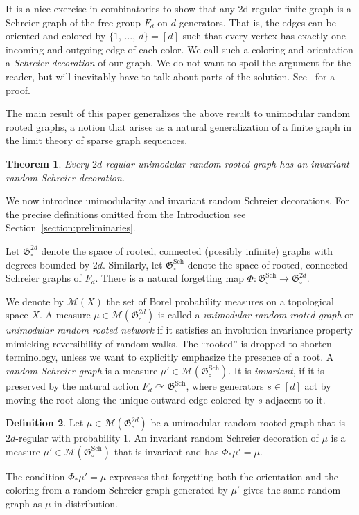 \documentclass[11pt]{article}
\newtheorem{theo}{Theorem}[section]
\theoremstyle{definition}
\newtheorem{defi}[theo]{Definition}
\numberwithin{equation}{section}
\numberwithin{figure}{section}
\numberwithin{table}{section}
\newcommand{\clM}{\mathcal{M}}
\newcommand{\GoG}{\mathfrak{G}}
\DeclareMathOperator{\Sch}{Sch}
\newcommand{\acts}{\curvearrowright}
\begin{document}
It is a nice exercise in combinatorics to show that any 2d-regular finite graph is a Schreier graph of the free group $F_d$ on $d$ generators. That is, the edges can be oriented and colored by $\{1,\,\ldots,\,d\}=[d]$ such that every vertex has exactly one incoming and outgoing edge of each color. We call such a coloring and orientation a \emph{Schreier decoration} of our graph. We do not want to spoil the argument for the reader, but will inevitably have to talk about parts of the solution. See~\cite{cannizzo2013invariant} for a proof.

The main result of this paper generalizes the above result to unimodular random rooted graphs, a notion that arises as a natural generalization of a finite graph in the limit theory of sparse graph sequences.

\begin{theo}\label{theorem:main}
Every $2d$-regular unimodular random rooted graph has an invariant random Schreier decoration.
\end{theo}
We now introduce unimodularity and invariant random Schreier decorations. For the precise definitions omitted from the Introduction see Section~\ref{section:preliminaries}.

Let $\GoG_{\circ}^{2d}$ denote the space of rooted, connected (possibly infinite) graphs with degrees bounded by $2d$. Similarly, let $\GoG_{\circ}^{\Sch}$ denote the space of rooted, connected Schreier graphs of $F_d$. There is a natural forgetting map $\Phi: \GoG_{\circ}^{\Sch} \to \GoG_{\circ}^{2d}$.

We denote by $\clM(X)$ the set of Borel probability measures on a topological space $X$. A measure $\mu \in \clM(\GoG_{\circ}^{2d})$ is called a \emph{unimodular random rooted graph} or \emph{unimodular random rooted network} if it satisfies an involution invariance property mimicking reversibility of random walks. The ``rooted'' is dropped to shorten terminology, unless we want to explicitly emphasize the presence of a root. A \emph{random Schreier graph} is a measure $\mu' \in \clM(\GoG_{\circ}^{\Sch})$. It is \emph{invariant}, if it is preserved by the natural action $F_d \acts \GoG_{\circ}^{\Sch}$, where generators $s \in [d]$ act by moving the root along the unique outward edge colored by $s$ adjacent to it.

\begin{defi}\label{definition:invariant_schreierization}
Let $\mu \in \clM(\GoG_{\circ}^{2d})$ be a unimodular random rooted graph that is $2d$-regular with probability 1. An invariant random Schreier decoration of $\mu$ is a measure $\mu' \in \clM(\GoG_{\circ}^{\Sch})$ that is invariant and has $\Phi_{*} \mu' = \mu$.
\end{defi}
\noindent The condition $\Phi_{*} \mu' = \mu$ expresses that forgetting both the orientation and the coloring from a random Schreier graph generated by $\mu'$ gives the same random graph as $\mu$ in distribution.
\end{document}

